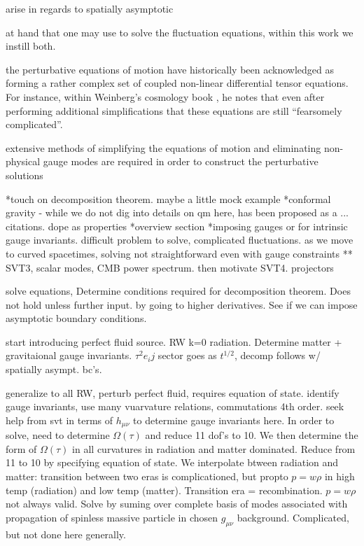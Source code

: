 arise in regards to spatially asymptotic


at hand that one may use to solve the fluctuation equations, within this work we instill both. 

the perturbative equations of motion have historically been acknowledged as forming a rather complex set of coupled non-linear differential tensor equations. For instance, within Weinberg's cosmology book \cite{weinberg_2008}, he notes that even after performing additional simplifications that these equations are still ``fearsomely complicated''. 






extensive methods of simplifying the equations of motion and eliminating non-physical gauge modes are required in order to construct the perturbative solutions


*touch on decomposition theorem. maybe a little mock example
*conformal gravity - while we do not dig into details on qm here, has been proposed as a ... citations. dope as properties
*overview section
*imposing gauges or for intrinsic gauge invariants. difficult problem to solve, complicated fluctuations. as we move to curved spacetimes, solving not straightforward even with gauge constraints
** SVT3, scalar modes, CMB power spectrum. then motivate SVT4. projectors


solve equations, Determine conditions required for decomposition theorem. Does not hold unless further input. by going to higher derivatives. See if we can impose asymptotic boundary conditions. 

start introducing perfect fluid source. RW k=0 radiation. Determine matter + gravitaional gauge invariants. $\tau^2 e_ij$ sector goes as $t^{1/2}$, decomp follows w/ spatially asympt. bc's.

generalize to all RW, perturb perfect fluid, requires equation of state. identify gauge invariants, use many vuarvature relations, commutations 4th order. seek help from svt in terms of $h_{\mu\nu}$ to determine gauge invariants here. In order to solve, need to determine $\Omega(\tau)$ and reduce 11 dof's to 10. We then determine the form of $\Omega(\tau)$ in all curvatures in radiation and matter dominated. Reduce from 11 to 10 by specifying equation of state. We interpolate btween radiation and matter: transition between two eras is complicationed, but propto $p=w\rho$ in high temp (radiation) and low temp (matter). Transition era = recombination. $p=w\rho$ not always valid. Solve by suming over complete basis of modes associated with propagation of spinless massive particle in chosen $g_{\mu\nu}$ background. Complicated, but not done here generally. 

